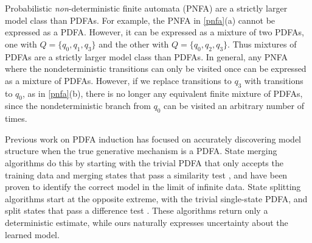 Probabilistic {\em non}-deterministic finite automata (PNFA) are a strictly larger model class than PDFAs.  For example, the PNFA in \ref{pnfa}(a) cannot be expressed as a PDFA.  However, it can be expressed as a mixture of two PDFAs, one with $Q = \{q_0,q_1,q_3\}$ and the other with $Q = \{q_0,q_2,q_3\}$.  Thus mixtures of PDFAs are a strictly larger model class than PDFAs.  In general, any PNFA where the nondeterministic transitions can only be visited once can be expressed as a mixture of PDFAs.  However, if we replace transitions to $q_3$ with transitions to $q_0$, as in \ref{pnfa}(b), there is no longer any equivalent finite mixture of PDFAs, since the nondeterministic branch from $q_0$ can be visited an arbitrary number of times.    
%

Previous work on PDFA induction has focused on accurately discovering model structure when the true generative mechanism is a PDFA.  State merging algorithms do this by starting with the trivial PDFA that only accepts the training data and merging states that pass a similarity test \cite{Carrasco1994,Thollard2000}, and have been proven to identify the correct model in the limit of infinite data.  State splitting algorithms start at the opposite extreme, with the trivial single-state PDFA, and split states that pass a difference test \cite{Ron1996,Shalizi2004}.  These algorithms return only a deterministic estimate, while ours naturally expresses uncertainty about the learned model.


